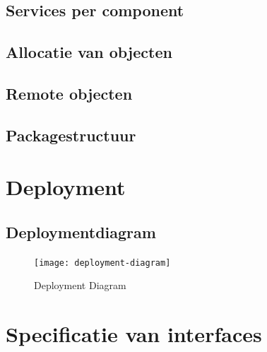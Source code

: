 \documentclass{scrreprt}
\begin{document}
	\section{Services per component}
	\section{Allocatie van objecten}
	\section{Remote objecten}
	\section{Packagestructuur}
	
	\newpage
	\chapter{Deployment}
	\section{Deploymentdiagram}
	\begin{figure}[ht]
		\centering
		\texttt{[image: deployment-diagram]}
		\label{pic:deployment-diagram}
		\caption{Deployment Diagram}
	\end{figure}
	
	\newpage
	\chapter{Specificatie van interfaces}
\end{document}

